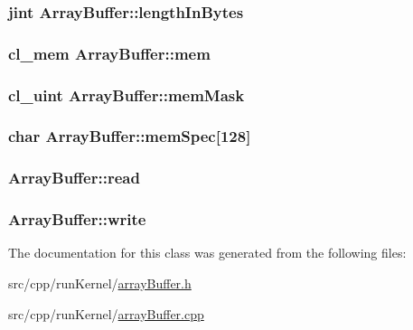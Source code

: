 \hypertarget{class_array_buffer_a30ebc774107e0aeedcad8228f20cacac}{
\subsubsection[{length\-In\-Bytes}]{\setlength{\rightskip}{0pt plus 5cm}jint Array\-Buffer\-::length\-In\-Bytes}}\label{class_array_buffer_a30ebc774107e0aeedcad8228f20cacac}
\hypertarget{class_array_buffer_a8ceddaf2157d696a6386c5ad2bff9526}{
\subsubsection[{mem}]{\setlength{\rightskip}{0pt plus 5cm}cl\-\_\-mem Array\-Buffer\-::mem}}\label{class_array_buffer_a8ceddaf2157d696a6386c5ad2bff9526}
\hypertarget{class_array_buffer_a3780a88f8a8b72c0d2894831daf0f95e}{
\subsubsection[{mem\-Mask}]{\setlength{\rightskip}{0pt plus 5cm}cl\-\_\-uint Array\-Buffer\-::mem\-Mask}}\label{class_array_buffer_a3780a88f8a8b72c0d2894831daf0f95e}
\hypertarget{class_array_buffer_ab7228af63eb8955afa0848f05154f964}{
\subsubsection[{mem\-Spec}]{\setlength{\rightskip}{0pt plus 5cm}char Array\-Buffer\-::mem\-Spec\mbox{[}128\mbox{]}}}\label{class_array_buffer_ab7228af63eb8955afa0848f05154f964}
\hypertarget{class_array_buffer_a61c626d6492770cc661f3018806cce69}{
\subsubsection[{read}]{ Array\-Buffer\-::read}}\label{class_array_buffer_a61c626d6492770cc661f3018806cce69}
\hypertarget{class_array_buffer_acbada5a527a38d5d6bd9da4e6f12f556}{
\subsubsection[{write}]{ Array\-Buffer\-::write}}\label{class_array_buffer_acbada5a527a38d5d6bd9da4e6f12f556}


The documentation for this class was generated from the following files\-:\begin{DoxyCompactItemize}
\item 
src/cpp/run\-Kernel/\hyperlink{array_buffer_8h}{array\-Buffer.\-h}\item 
src/cpp/run\-Kernel/\hyperlink{array_buffer_8cpp}{array\-Buffer.\-cpp}\end{DoxyCompactItemize}
